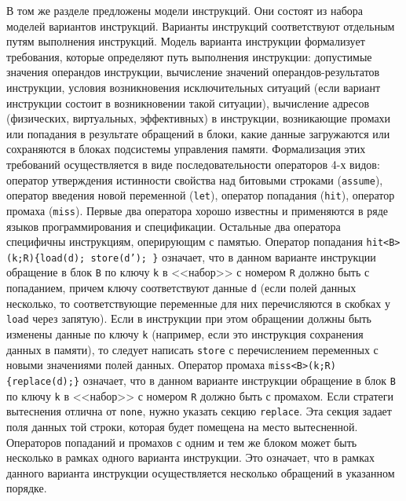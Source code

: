 \documentclass[14pt,autoref,href
,facsimile
]{disser}
\begin{document}
В том же разделе предложены модели инструкций. Они состоят из набора моделей вариантов инструкций. Варианты инструкций соответствуют отдельным путям выполнения инструкций. Модель варианта инструкции формализует требования, которые определяют путь выполнения инструкции: допустимые значения операндов инструкции, вычисление значений операндов-результатов инструкции, условия возникновения исключительных ситуаций (если вариант инструкции состоит в возникновении такой ситуации), вычисление адресов (физических, виртуальных, эффективных) в инструкции, возникающие промахи или попадания в результате обращений в блоки, какие данные загружаются или сохраняются в блоках подсистемы управления памяти. Формализация этих требований осуществляется в виде последовательности операторов 4-х видов: оператор утверждения истинности свойства над битовыми строками (\texttt{assume}), оператор введения новой переменной (\texttt{let}), оператор попадания (\texttt{hit}), оператор промаха (\texttt{miss}). Первые два оператора хорошо известны и применяются в ряде языков программирования и спецификации. Остальные два оператора специфичны инструкциям, оперирующим с памятью. Оператор попадания \texttt{hit<B>(k;R)\{load(d); store(d'); \}} означает, что в данном варианте инструкции обращение в блок \texttt{B} по ключу \texttt{k} в <<набор>> с номером \texttt{R} должно быть с попаданием, причем ключу соответствуют данные \texttt{d} (если полей данных несколько, то соответствующие переменные для них перечисляются в скобках у \texttt{load} через запятую). Если в инструкции при этом обращении должны быть изменены данные по ключу \texttt{k} (например, если это инструкция сохранения данных в памяти), то следует написать \texttt{store} с перечислением переменных с новыми значениями полей данных. Оператор промаха \texttt{miss<B>(k;R)\{replace(d);\}} означает, что в данном варианте инструкции обращение в блок \texttt{B} по ключу \texttt{k} в <<набор>> с номером \texttt{R} должно быть с промахом. Если стратеги вытеснения отлична от \texttt{none}, нужно указать секцию \texttt{replace}. Эта секция задает поля данных той строки, которая будет помещена на место вытесненной. Операторов попаданий и промахов с одним и тем же блоком может быть несколько в рамках одного варианта инструкции. Это означает, что в рамках данного варианта инструкции осуществляется несколько обращений в указанном порядке.
\end{document}
